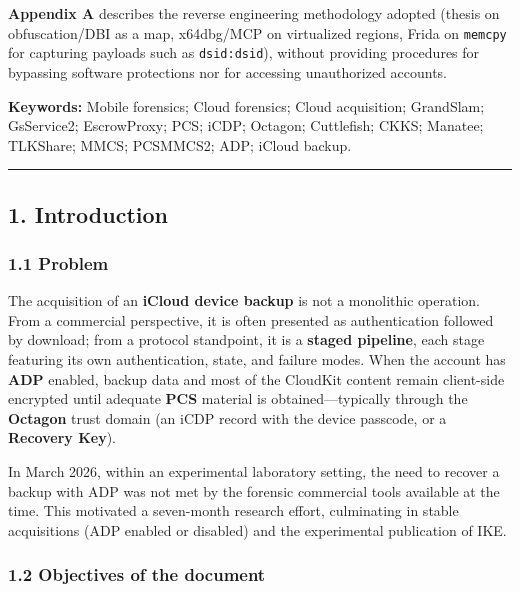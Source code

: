 \documentclass[
  english,
  10pt]{article}
\begin{document}
\textbf{Appendix A} describes the reverse engineering methodology
adopted (thesis on obfuscation/DBI as a map, x64dbg/MCP on virtualized
regions, Frida on \texttt{memcpy} for capturing payloads such as
\texttt{dsid:dsid}), without providing procedures for bypassing software
protections nor for accessing unauthorized accounts.

\textbf{Keywords:} Mobile forensics; Cloud forensics; Cloud acquisition;
GrandSlam; GsService2; EscrowProxy; PCS; iCDP; Octagon; Cuttlefish;
CKKS; Manatee; TLKShare; MMCS; PCSMMCS2; ADP; iCloud backup.

\begin{center}\rule{0.5\linewidth}{0.5pt}\end{center}

\subsection{1. Introduction}\label{introduction}

\subsubsection{1.1 Problem}\label{problem}

The acquisition of an \textbf{iCloud device backup} is not a monolithic
operation. From a commercial perspective, it is often presented as
authentication followed by download; from a protocol standpoint, it is a
\textbf{staged pipeline}, each stage featuring its own authentication,
state, and failure modes. When the account has \textbf{ADP} enabled,
backup data and most of the CloudKit content remain client-side
encrypted until adequate \textbf{PCS} material is obtained---typically
through the \textbf{Octagon} trust domain (an iCDP record with the
device passcode, or a \textbf{Recovery Key}).

In March 2026, within an experimental laboratory setting, the need to
recover a backup with ADP was not met by the forensic commercial tools
available at the time. This motivated a seven-month research effort,
culminating in stable acquisitions (ADP enabled or disabled) and the
experimental publication of IKE.

\subsubsection{1.2 Objectives of the
document}\label{objectives-of-the-document}
\end{document}
